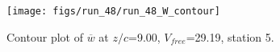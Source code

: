 \begin{figure}[H]
\centering
\texttt{[image: figs/run\_48/run\_48\_W\_contour]}
\caption{Contour plot of $\overline{w}$ at $z/c$=9.00, $V_{free}$=29.19, station 5.}
\end{figure}


